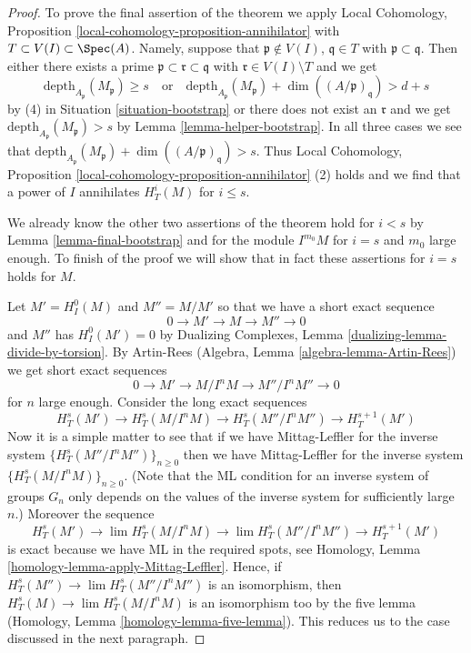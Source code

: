 \begin{proof}
To prove the final assertion of the theorem we apply Local Cohomology,
Proposition \ref{local-cohomology-proposition-annihilator} with
$T \subset V(I) \subset \Spec(A)$. Namely, suppose
that $\mathfrak p \not \in V(I)$, $\mathfrak q \in T$
with $\mathfrak p \subset \mathfrak q$.
Then either there exists a prime
$\mathfrak p \subset \mathfrak r \subset \mathfrak q$
with $\mathfrak r \in V(I) \setminus T$ and we get
$$
\text{depth}_{A_\mathfrak p}(M_\mathfrak p) \geq s
\quad\text{or}\quad
\text{depth}_{A_\mathfrak p}(M_\mathfrak p) +
\dim((A/\mathfrak p)_\mathfrak q) > d + s
$$
by (4) in Situation \ref{situation-bootstrap} or there does
not exist an $\mathfrak r$ and we get
$\text{depth}_{A_\mathfrak p}(M_\mathfrak p) > s$ by
Lemma \ref{lemma-helper-bootstrap}.
In all three cases we see that
$\text{depth}_{A_\mathfrak p}(M_\mathfrak p) +
\dim((A/\mathfrak p)_\mathfrak q) > s$.
Thus Local Cohomology, Proposition
\ref{local-cohomology-proposition-annihilator} (2)
holds and we find that a power of $I$ annihilates
$H^i_T(M)$ for $i \leq s$.

\medskip\noindent
We already know the other two assertions of the theorem hold
for $i < s$ by Lemma \ref{lemma-final-bootstrap} and for the
module $I^{m_0}M$ for $i = s$ and $m_0$ large enough.
To finish of the proof we will show that in fact these
assertions for $i = s$ holds for $M$.

\medskip\noindent
Let $M' = H^0_I(M)$ and $M'' = M/M'$ so that we have a short exact
sequence
$$
0 \to M' \to M \to M'' \to 0
$$
and $M''$ has $H^0_I(M') = 0$ by
Dualizing Complexes, Lemma \ref{dualizing-lemma-divide-by-torsion}.
By Artin-Rees (Algebra, Lemma \ref{algebra-lemma-Artin-Rees})
we get short exact sequences
$$
0 \to M' \to M/I^n M \to M''/I^n M'' \to 0
$$
for $n$ large enough. Consider the long exact sequences
$$
H^s_T(M') \to
H^s_T(M/I^nM) \to
H^s_T(M''/I^nM'') \to
H^{s + 1}_T(M')
$$
Now it is a simple matter to see that if we have Mittag-Leffler
for the inverse system $\{H^s_T(M''/I^nM'')\}_{n \geq 0}$
then we have Mittag-Leffler for the inverse system
$\{H^s_T(M/I^nM)\}_{n \geq 0}$.
(Note that the ML condition for an inverse system of groups $G_n$
only depends on the values of the inverse system for sufficiently large $n$.)
Moreover the sequence
$$
H^s_T(M') \to
\lim H^s_T(M/I^nM) \to
\lim H^s_T(M''/I^nM'') \to
H^{s + 1}_T(M')
$$
is exact because we have ML in the required spots, see
Homology, Lemma \ref{homology-lemma-apply-Mittag-Leffler}.
Hence, if $H^s_T(M'') \to \lim H^s_T(M''/I^nM'')$
is an isomorphism, then
$H^s_T(M) \to \lim H^s_T(M/I^nM)$
is an isomorphism too by the five lemma
(Homology, Lemma \ref{homology-lemma-five-lemma}).
This reduces us to the case discussed in the next paragraph.


\end{proof}
